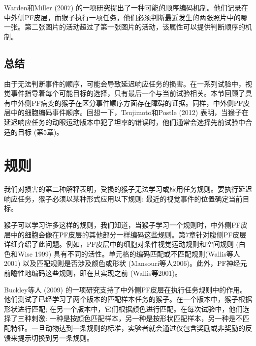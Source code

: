 Warden和Miller (2007) 的一项研究提出了一种可能的顺序编码机制。他们记录在中外侧PF皮层，而猴子执行一项任务，他们必须判断最近发生的两张照片中的哪一张。第二张图片的活动超过了第一张图片的活动，该属性可以提供判断顺序的机制。
\subsection{总结}
由于无法判断事件的顺序，可能会导致延迟响应任务的损害。在一系列试验中，视觉事件指导着每个可能目标的选择，只有最后一个与当前试验相关。本节回顾了具有中外侧PF病变的猴子在区分事件顺序方面存在障碍的证据。同样，中外侧PF皮层中的细胞编码事件顺序。回想一下，Tsujimoto和Postle (2012) 表明，当猴子在延迟响应任务的动眼运动版本中犯了坦率的错误时，他们通常会选择先前试验中合适的目标 (第5章)。

\section{规则}
我们对损害的第二种解释表明，受损的猴子无法学习或应用任务规则。要执行延迟响应任务，猴子必须以某种形式应用以下规则: 最近的视觉事件的位置确定当前目标。

猴子可以学习许多这样的规则，我们知道，当猴子学习一个规则时，中外侧PF皮层中的细胞会像在PF皮层的其他部分一样编码这些规则。第7章针对腹侧PF皮层详细介绍了此问题。例如，PF皮层中的细胞对条件视觉运动规则和空间规则 (白色和Wise 1999) 具有不同的活性。单元格的编码匹配或不匹配规则(Wallis等人2001) 以及匹配规则是否涉及颜色或形状 (Mansouri等人2006)。此外，PF神经元前瞻性地编码这些规则，即在其实现之前 (Wallis等2001)。

Buckley等人 (2009) 的一项研究支持了中外侧PF皮层在执行任务规则中的作用。他们测试了已经学习了两个版本的匹配样本任务的猴子。在一个版本中，猴子根据形状进行匹配; 在另一个版本中，它们根据颜色进行匹配。在每次试验中，他们选择了三种刺激: 一种是按颜色匹配样本，另一种是按形状匹配样本，另一种是不匹配特征。一旦动物达到一条规则的标准，实验者就会通过仅包含奖励或非奖励的反馈来提示切换到另一条规则。

